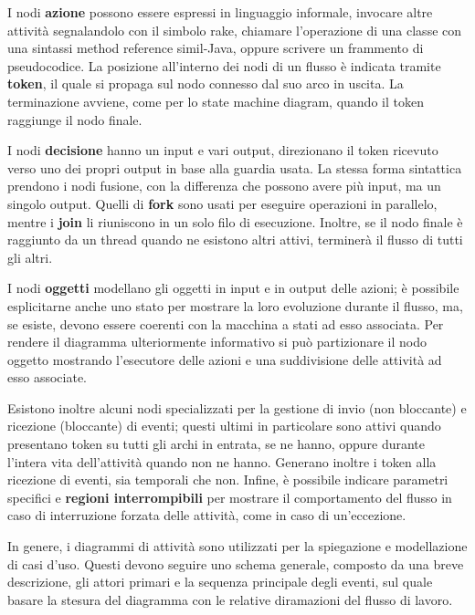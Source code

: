 \noindent I nodi \textbf{azione} possono essere espressi in linguaggio informale, invocare altre attività segnalandolo con il simbolo rake, chiamare
l'operazione di una classe con una sintassi method reference simil-Java, oppure scrivere un frammento di pseudocodice. La posizione all'interno dei nodi
di un flusso è indicata tramite \textbf{token}, il quale si propaga sul nodo connesso dal suo arco in uscita. La terminazione avviene, come per lo
state machine diagram, quando il token raggiunge il nodo finale.\par
I nodi \textbf{decisione} hanno un input e vari output, direzionano il token ricevuto verso uno dei propri output in base alla guardia usata. La stessa
forma sintattica prendono i nodi fusione, con la differenza che possono avere più input, ma un singolo output. Quelli di \textbf{fork} sono usati per
eseguire operazioni in parallelo, mentre i \textbf{join} li riuniscono in un solo filo di esecuzione. Inoltre, se il nodo finale è raggiunto da un
thread quando ne esistono altri attivi, terminerà il flusso di tutti gli altri.\par
I nodi \textbf{oggetti} modellano gli oggetti in input e in output delle azioni; è possibile esplicitarne anche uno stato per mostrare la loro
evoluzione durante il flusso, ma, se esiste, devono essere coerenti con la macchina a stati ad esso associata. Per rendere il diagramma ulteriormente
informativo si può partizionare il nodo oggetto mostrando l'esecutore delle azioni e una suddivisione delle attività ad esso associate.\par
Esistono inoltre alcuni nodi specializzati per la gestione di invio (non bloccante) e ricezione (bloccante) di eventi; questi ultimi in particolare
sono attivi quando presentano token su tutti gli archi in entrata, se ne hanno, oppure durante l'intera vita dell'attività quando non ne hanno.
Generano inoltre i token alla ricezione di eventi, sia temporali che non. Infine, è possibile indicare parametri specifici e \textbf{regioni
interrompibili} per mostrare il comportamento del flusso in caso di interruzione forzata delle attività, come in caso di un'eccezione.\par
In genere, i diagrammi di attività sono utilizzati per la spiegazione e modellazione di casi d'uso. Questi devono seguire uno schema generale, composto
da una breve descrizione, gli attori primari e la sequenza principale degli eventi, sul quale basare la stesura del diagramma con le relative
diramazioni del flusso di lavoro.

%

